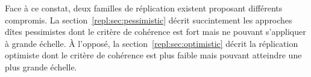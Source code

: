 Face à ce constat, deux familles de réplication existent proposant différents
compromis. La section~\ref{repl:sec:pessimistic} décrit succintement les
approches dîtes pessimistes dont le critère de cohérence est fort mais ne
pouvant s'appliquer à grande échelle. À l'opposé, la
section~\ref{repl:sec:optimistic} décrit la réplication optimiste dont le
critère de cohérence est plus faible mais pouvant atteindre une plus grande
échelle.

